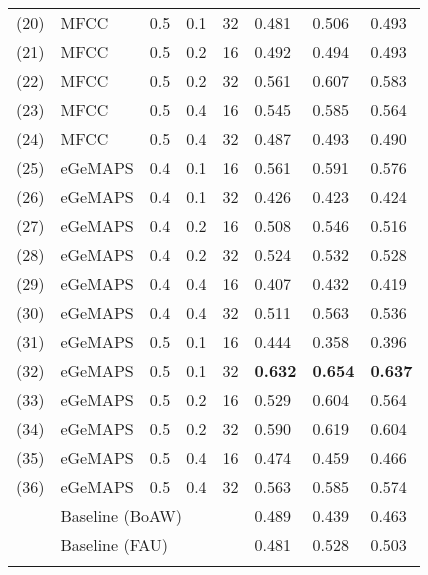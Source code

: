\begin{table}[htb]
\begin{tabular}{l|l|p{1.25cm}|l|p{1.2cm}|l|l|l}
        (20) & MFCC & 0.5 & 0.1 & 32 & 0.481 & 0.506 & 0.493 \\
        (21) & MFCC & 0.5 & 0.2 & 16 & 0.492 & 0.494 & 0.493 \\
        (22) & MFCC & 0.5 & 0.2 & 32 & 0.561 & 0.607 & 0.583 \\
        (23) & MFCC & 0.5 & 0.4 & 16 & 0.545 & 0.585 & 0.564 \\
        (24) & MFCC & 0.5 & 0.4 & 32 & 0.487 & 0.493 & 0.490 \\
        \hline
        (25) & eGeMAPS & 0.4 & 0.1 & 16 & 0.561 & 0.591 & 0.576 \\
        (26) & eGeMAPS & 0.4 & 0.1 & 32 & 0.426 & 0.423 & 0.424 \\
        (27) & eGeMAPS & 0.4 & 0.2 & 16 & 0.508 & 0.546 & 0.516  \\
        (28) & eGeMAPS & 0.4 & 0.2 & 32 & 0.524 & 0.532 & 0.528 \\
        (29) & eGeMAPS & 0.4 & 0.4 & 16 & 0.407 & 0.432 & 0.419 \\
        (30) & eGeMAPS & 0.4 & 0.4 & 32 & 0.511 & 0.563 & 0.536 \\
        (31) & eGeMAPS & 0.5 & 0.1 & 16 & 0.444 & 0.358 & 0.396 \\
        (32) & eGeMAPS & 0.5 & 0.1 & 32 & \textbf{0.632} & \textbf{0.654} & \textbf{0.637} \\
        (33) & eGeMAPS & 0.5 & 0.2 & 16 & 0.529 & 0.604 & 0.564 \\
        (34) & eGeMAPS & 0.5 & 0.2 & 32 & 0.590 & 0.619 & 0.604 \\
        (35) & eGeMAPS & 0.5 & 0.4 & 16 & 0.474 & 0.459 & 0.466 \\
        (36) & eGeMAPS & 0.5 & 0.4 & 32 & 0.563 & 0.585 & 0.574 \\
        \hline
        & \multicolumn{4}{l|}{Baseline (BoAW)} & 0.489 & 0.439 & 0.463 \\
        & \multicolumn{4}{l|}{Baseline (FAU)} & 0.481 & 0.528 & 0.503 \\
    \Xhline{2\arrayrulewidth}
    \end{tabular}
    \label{tab:unimodal_res_full}
\end{table}


